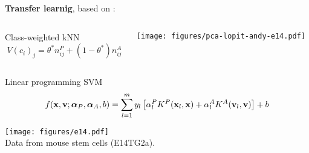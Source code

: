 \begin{frame}
  \textbf{Transfer learnig}, based on \cite{Wu:2004}:
  \begin{columns}[t]
    \begin{column}[T]{0.5\textwidth}            
      \begin{block}{Class-weighted kNN}      
        \begin{equation*}
          \label{eq:translearn}
          V(c_i)_j = \theta^* n_{ij}^{P} + (1 - \theta^*) n_{ij}^{A}
        \end{equation*}
      \end{block}
    \end{column}
    \begin{column}[T]{0.4\textwidth} 
      \texttt{[image: figures/pca-lopit-andy-e14.pdf]} \\
    \end{column}    
  \end{columns}
  \begin{block}{Linear programming SVM}
    \begin{equation*}\label{eq:translearn2}
      f(\mathbf{x}, \mathbf{v}; \bm{\alpha}_P, \bm{\alpha}_A, b) = \sum_{l=1}^m y_l \left[ \alpha_l^P
        K^P(\mathbf{x}_l, \mathbf{x}) + \alpha_l^A K^A(\mathbf{v}_l, \mathbf{v}) \right] + b
    \end{equation*}
  \end{block}
\end{frame}


% 



\begin{frame}
  \texttt{[image: figures/e14.pdf]}
  \\
  \scriptsize
  Data from mouse stem cells (E14TG2a).
\end{frame}


